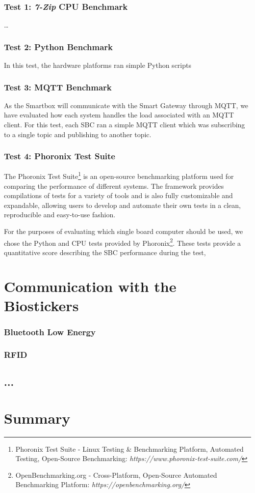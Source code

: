 \subsubsection{Test 1: \textit{7-Zip} CPU Benchmark}
\dots

\subsubsection{Test 2: Python Benchmark}
In this test, the hardware platforms ran simple Python scripts 


\subsubsection{Test 3: \acs{MQTT} Benchmark}
As the Smartbox will communicate with the Smart Gateway through \acs{MQTT}, we have evaluated how each system handles the load associated with an MQTT client. For this test, each \acs{SBC} ran a simple \acs{MQTT} client which was subscribing to a single topic and publishing to another topic.


\subsubsection{Test 4: Phoronix Test Suite}
The Phoronix Test Suite\footnote{Phoronix Test Suite - Linux Testing \& Benchmarking Platform, Automated Testing, Open-Source Benchmarking: \textit{https://www.phoronix-test-suite.com/}} is an open-source benchmarking platform used for comparing the performance of different systems. The framework provides compilations of tests for a variety of tools and is also fully customizable and expandable, allowing users to develop and automate their own tests in a clean, reproducible and easy-to-use fashion.  

For the purposes of evaluating which single board computer should be used, we chose the Python and CPU tests provided by Phoronix\footnote{OpenBenchmarking.org - Cross-Platform, Open-Source Automated Benchmarking Platform: \textit{https://openbenchmarking.org/}}. These tests provide a quantitative score describing the \acs{SBC} performance during the test, 


\section{Communication with the Biostickers}

\subsubsection{Bluetooth Low Energy}
\subsubsection{\acf{RFID}}

\subsection{...}

\section{Summary}
\renewcommand{\arraystretch}{1}